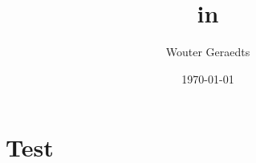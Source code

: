 \documentclass[a4paper,titlepage,twoside]{article}
\title{\Premiseselection in \coq}
\author{Wouter Geraedts}
\date{\today}
\begin{document}
	\maketitle
	
	\section{Test}
	
    
    
\end{document}
